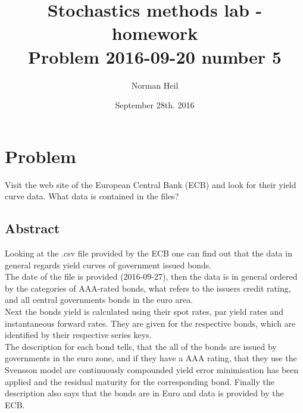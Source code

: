 \documentclass{article}
\title{Stochastics methods lab - homework\\[0.5cm]
\large Problem 2016-09-20 number 5}
\author{Norman Heil}
\date{September 28th. 2016}
\begin{document}
\maketitle
\section{Problem}
Visit the web site of the European Central Bank (ECB) and look for their yield curve data. What data is contained in the files?
\subsection{Abstract}
Looking at the .csv file provided by the ECB one can find out that the data in general regards yield curves of government issued bonds.\\
The date of the file is provided (2016-09-27), then the data is in general ordered by the categories of AAA-rated bonds, what refers to the issuers credit rating, and all central governments bonds in the euro area.\\
Next the bonds yield is calculated using their spot rates, par yield rates and instantaneous forward rates. They are given for the respective bonds, which are identified by their respective series keys.\\
The description for each bond tells, that the all of the bonds are issued by governments in the euro zone, and if they have a AAA rating, that they use the Svensson model are continuously compounded yield error minimisation has been applied and the residual maturity for the corresponding bond. Finally the description also says that the bonds are in Euro and data is provided by the ECB.
\end{document}
